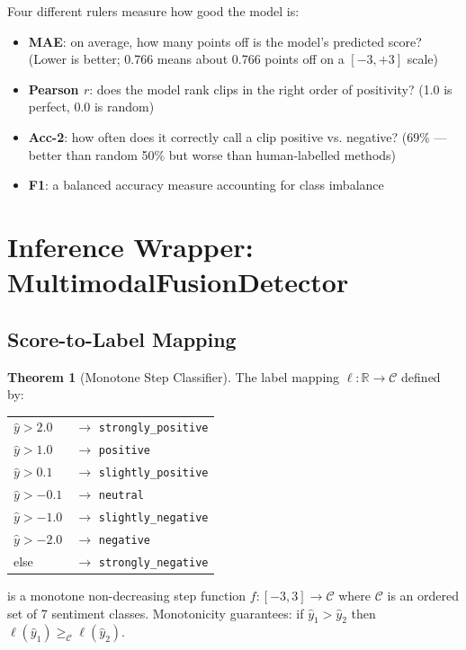 \documentclass[12pt,a4paper]{article}
\theoremstyle{definition}
\newtheorem{theorem}{Theorem}[section]
\begin{document}
\begin{laymanbox}
Four different rulers measure how good the model is:
\begin{itemize}[nosep]
  \item \textbf{MAE}: on average, how many points off is the model's predicted score? (Lower is better; 0.766 means about 0.766 points off on a $[-3,+3]$ scale)
  \item \textbf{Pearson $r$}: does the model rank clips in the right order of positivity? (1.0 is perfect, 0.0 is random)
  \item \textbf{Acc-2}: how often does it correctly call a clip positive vs. negative? (69\% — better than random 50\% but worse than human-labelled methods)
  \item \textbf{F1}: a balanced accuracy measure accounting for class imbalance
\end{itemize}
\end{laymanbox}

\section{Inference Wrapper: MultimodalFusionDetector}

\subsection{Score-to-Label Mapping}

\begin{theorem}[Monotone Step Classifier]
The label mapping $\ell: \mathbb{R} \to \mathcal{C}$ defined by:
\begin{center}
\begin{tabular}{ll}
$\hat{y} > 2.0$ & $\to$ \texttt{strongly\_positive} \\
$\hat{y} > 1.0$ & $\to$ \texttt{positive} \\
$\hat{y} > 0.1$ & $\to$ \texttt{slightly\_positive} \\
$\hat{y} > -0.1$ & $\to$ \texttt{neutral} \\
$\hat{y} > -1.0$ & $\to$ \texttt{slightly\_negative} \\
$\hat{y} > -2.0$ & $\to$ \texttt{negative} \\
else & $\to$ \texttt{strongly\_negative}
\end{tabular}
\end{center}
is a monotone non-decreasing step function $f: [-3,3] \to \mathcal{C}$ where $\mathcal{C}$ is an ordered set of 7 sentiment classes. Monotonicity guarantees: if $\hat{y}_1 > \hat{y}_2$ then $\ell(\hat{y}_1) \geq_{\mathcal{C}} \ell(\hat{y}_2)$.
\end{theorem}
\end{document}
